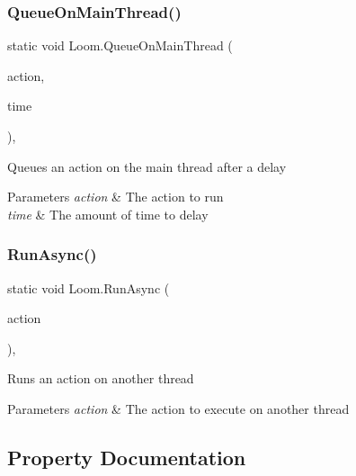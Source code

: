 \subsubsection{\texorpdfstring{Queue\+On\+Main\+Thread()}{QueueOnMainThread()}\hspace{0.1cm}{\footnotesize\ttfamily [2/2]}}
{\footnotesize\ttfamily static void Loom.\+Queue\+On\+Main\+Thread (\begin{DoxyParamCaption}\item[{Action}]{action,  }\item[{float}]{time }\end{DoxyParamCaption})\hspace{0.3cm}{\ttfamily [inline]}, {\ttfamily [static]}}



Queues an action on the main thread after a delay 


\begin{DoxyParams}{Parameters}
{\em action} & The action to run \\
\hline
{\em time} & The amount of time to delay \\
\hline
\end{DoxyParams}
\mbox{\label{class_loom_a96dca2cf633909a32613b23bf7006f80}} 
\subsubsection{\texorpdfstring{Run\+Async()}{RunAsync()}}
{\footnotesize\ttfamily static void Loom.\+Run\+Async (\begin{DoxyParamCaption}\item[{Action}]{action }\end{DoxyParamCaption})\hspace{0.3cm}{\ttfamily [inline]}, {\ttfamily [static]}}



Runs an action on another thread 


\begin{DoxyParams}{Parameters}
{\em action} & The action to execute on another thread \\
\hline
\end{DoxyParams}


\subsection{Property Documentation}
\mbox{\label{class_loom_a755c2c53122fe9c9a7447699f6fa27b8}} 
